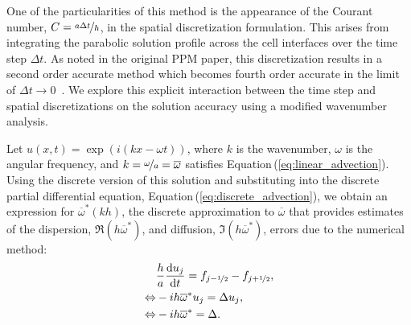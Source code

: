 \documentclass[review]{elsarticle}
\begin{document}
One of the particularities of this method is the appearance of the
Courant number, $C = \nicefrac{a\Delta t}{h}$, in the spatial
discretization formulation. This arises from integrating the parabolic
solution profile across the cell interfaces over the time step
$\Delta t$. As noted in the original PPM paper, this discretization
results in a second order accurate method which becomes fourth order
accurate in the limit of $\Delta t \to 0$~\cite{Colella1984}. We
explore this explicit interaction between the time step and spatial
discretizations on the solution accuracy using a modified wavenumber
analysis.

Let $u(x,t) = \exp{\left( i(kx-\omega t) \right)}$, where $k$ is the
wavenumber, $\omega$ is the angular frequency, and
$k = \nicefrac{\omega}{a} = \overline{\omega}$ satisfies
Equation\,(\ref{eq:linear_advection}). Using the discrete version of
this solution and substituting into the discrete partial differential
equation, Equation\,(\ref{eq:discrete_advection}), we obtain an
expression for $\overline{\omega}^*(kh)$, the discrete approximation
to $\overline{\omega}$ that provides estimates of the dispersion,
$\Re (h\overline{\omega}^*)$, and diffusion,
$\Im (h\overline{\omega}^*)$, errors due to the numerical method:
\begin{align*}
  & \frac{h}{a} \frac{\mathrm{d} u_j}{\mathrm{d} t} = f_{j-\nicefrac{1}{2}} - f_{j+\nicefrac{1}{2}},\\
  \Leftrightarrow & -i h \overline{\omega}^* u_j = \Delta u_j,\\
  \Leftrightarrow & -i h \overline{\omega}^* = \Delta.
\end{align*}
\end{document}
